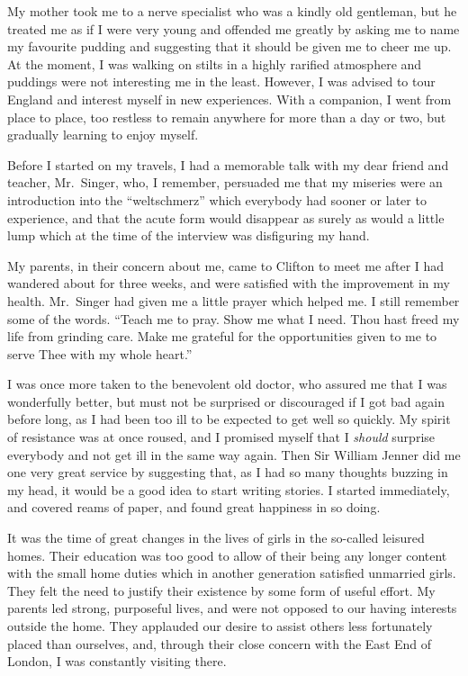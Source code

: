 My mother took me to a nerve specialist who was a
kindly old gentleman, but he treated me as if I were very
young and offended me greatly by asking me to name my
favourite pudding and suggesting that it should be given
me to cheer me up. At the moment, I was walking on
stilts in a highly rarified atmosphere and puddings were
not interesting me in the least. However, I was advised
to tour England and interest myself in new experiences.
With a companion, I went from place to place, too
restless to remain anywhere for more than a day or two,
but gradually learning to enjoy myself.

Before I started on my travels, I had a memorable
talk with my dear friend and teacher, Mr.\ Singer, who,
I remember, persuaded me that my miseries were an
introduction into the “weltschmerz” which everybody
had sooner or later to experience, and that the acute
form would disappear as surely as would a little lump
which at the time of the interview was disfiguring my
hand.

My parents, in their concern about me, came to
Clifton to meet me after I had wandered about for three
weeks, and were satisfied with the improvement in my
health. Mr.\ Singer had given me a little prayer which
helped me. I still remember some of the words. “Teach
me to pray. Show me what I need. Thou hast freed my
life from grinding care. Make me grateful for the
opportunities given to me to serve Thee with my whole
heart.”

I was once more taken to the benevolent old
doctor, who assured me that I was wonderfully
better, but must not be surprised or discouraged
if I got bad again before long, as I had been too ill
to be expected to get well so quickly. My spirit of
resistance was at once roused, and I promised myself
that I \textsl{should} surprise everybody and not get ill in the
same way again. Then Sir William Jenner did me one
very great service by suggesting that, as I had so many
thoughts buzzing in my head, it would be a good idea to
start writing stories. I started immediately, and covered
reams of paper, and found great happiness in so doing.

It was the time of great changes in the lives of girls
in the so-called leisured homes. Their education was too
good to allow of their being any longer content with the
small home duties which in another generation satisfied
unmarried girls. They felt the need to justify their
existence by some form of useful effort. My parents led
strong, purposeful lives, and were not opposed to our
having interests outside the home. They applauded our
desire to assist others less fortunately placed than
ourselves, and, through their close concern with the East End
of London, I was constantly visiting there.

